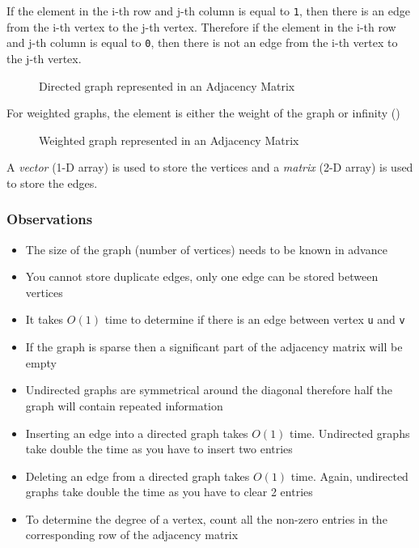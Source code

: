 If the element in the i-th row and j-th column is equal to \verb|1|, then there is an edge from the i-th vertex to the j-th vertex. Therefore if the element in the i-th row and j-th column is equal to \verb|0|, then there is not an edge from the i-th vertex to the j-th vertex.
\begin{figure}[H]
    \centering
    
    \caption{Directed graph represented in an Adjacency Matrix}
\end{figure}

For weighted graphs, the element is either the weight of the graph or infinity (\infty)

\begin{figure}[H]
    \centering
    
    \caption{Weighted graph represented in an Adjacency Matrix}
\end{figure}

A \textit{vector} (1-D array) is used to store the vertices and a \textit{matrix} (2-D array) is used to store the edges.

\subsubsection{Observations}
\begin{itemize}
    \item The size of the graph (number of vertices) needs to be known in advance
    \item You cannot store duplicate edges, only one edge can be stored between vertices
    \item It takes $O(1)$ time to determine if there is an edge between vertex \verb|u| and \verb|v|
    \item If the graph is sparse then a significant part of the adjacency matrix will be empty
    \item Undirected graphs are symmetrical around the diagonal therefore half the graph will contain repeated information
    \item Inserting an edge into a directed graph takes $O(1)$ time. Undirected graphs take double the time as you have to insert two entries
    \item Deleting an edge from a directed graph takes $O(1)$ time. Again, undirected graphs take double the time as you have to clear 2 entries
    \item To determine the degree of a vertex, count all the non-zero entries in the corresponding row of the adjacency matrix
\end{itemize}

